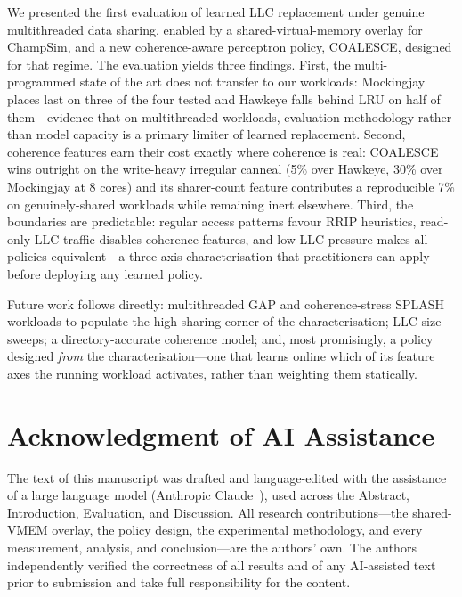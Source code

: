 \documentclass[conference]{IEEEtran}
\begin{document}
We presented the first evaluation of learned LLC replacement under genuine multithreaded data sharing, enabled by a shared-virtual-memory overlay for ChampSim, and a new coherence-aware perceptron policy, COALESCE, designed for that regime. The evaluation yields three findings. First, the multi-programmed state of the art does not transfer to our workloads: Mockingjay places last on three of the four tested and Hawkeye falls behind LRU on half of them---evidence that on multithreaded workloads, evaluation methodology rather than model capacity is a primary limiter of learned replacement. Second, coherence features earn their cost exactly where coherence is real: COALESCE wins outright on the write-heavy irregular canneal (5\% over Hawkeye, 30\% over Mockingjay at 8 cores) and its sharer-count feature contributes a reproducible 7\% on genuinely-shared workloads while remaining inert elsewhere. Third, the boundaries are predictable: regular access patterns favour RRIP heuristics, read-only LLC traffic disables coherence features, and low LLC pressure makes all policies equivalent---a three-axis characterisation that practitioners can apply before deploying any learned policy.

Future work follows directly: multithreaded GAP and coherence-stress SPLASH workloads to populate the high-sharing corner of the characterisation; LLC size sweeps; a directory-accurate coherence model; and, most promisingly, a policy designed \emph{from} the characterisation---one that learns online which of its feature axes the running workload activates, rather than weighting them statically.

\section*{Acknowledgment of AI Assistance}
The text of this manuscript was drafted and language-edited with the assistance of a large language model (Anthropic Claude~\cite{claude}), used across the Abstract, Introduction, Evaluation, and Discussion. All research contributions---the shared-VMEM overlay, the policy design, the experimental methodology, and every measurement, analysis, and conclusion---are the authors' own. The authors independently verified the correctness of all results and of any AI-assisted text prior to submission and take full responsibility for the content.
\end{document}
